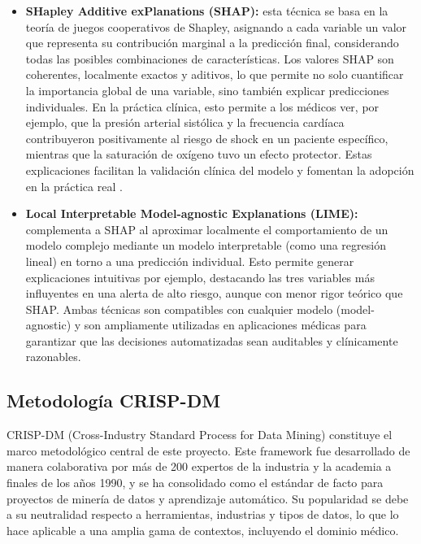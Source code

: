 \begin{itemize}
    \item \textbf{SHapley Additive exPlanations (SHAP):} esta técnica se basa en la teoría de juegos cooperativos de Shapley, asignando a cada variable un valor que representa su contribución marginal a la predicción final, considerando todas las posibles combinaciones de características. Los valores SHAP son coherentes, localmente exactos y aditivos, lo que permite no solo cuantificar la importancia global de una variable, sino también explicar predicciones individuales. En la práctica clínica, esto permite a los médicos ver, por ejemplo, que la presión arterial sistólica y la frecuencia cardíaca contribuyeron positivamente al riesgo de shock en un paciente específico, mientras que la saturación de oxígeno tuvo un efecto protector. Estas explicaciones facilitan la validación clínica del modelo y fomentan la adopción en la práctica real \cite{lundberg2017}.

    \item \textbf{Local Interpretable Model-agnostic Explanations (LIME):} complementa a SHAP al aproximar localmente el comportamiento de un modelo complejo mediante un modelo interpretable (como una regresión lineal) en torno a una predicción individual. Esto permite generar explicaciones intuitivas por ejemplo, destacando las tres variables más influyentes en una alerta de alto riesgo, aunque con menor rigor teórico que SHAP. Ambas técnicas son compatibles con cualquier modelo (model-agnostic) y son ampliamente utilizadas en aplicaciones médicas para garantizar que las decisiones automatizadas sean auditables y clínicamente razonables.
\end{itemize}

\subsection{Metodología CRISP-DM}

CRISP-DM (Cross-Industry Standard Process for Data Mining) \cite{crispdm1999} constituye el marco metodológico central de este proyecto. Este framework fue desarrollado de manera colaborativa por más de 200 expertos de la industria y la academia a finales de los años 1990, y se ha consolidado como el estándar de facto para proyectos de minería de datos y aprendizaje automático. Su popularidad se debe a su neutralidad respecto a herramientas, industrias y tipos de datos, lo que lo hace aplicable a una amplia gama de contextos, incluyendo el dominio médico.

